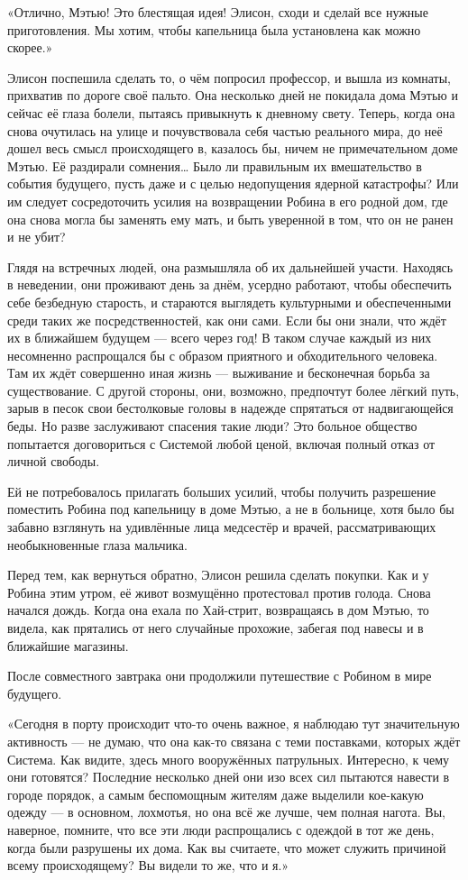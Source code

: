 \documentclass[a5paper, 9pt,
final, openany, twoside=true]{memoir}
\begin{document}
«Отлично, Мэтью! Это блестящая идея! Элисон, сходи и сделай все нужные приготовления. Мы хотим, чтобы капельница была установлена как можно скорее.»\bigskip

Элисон поспешила сделать то, о чём попросил профессор, и вышла из комнаты, прихватив по дороге своё пальто. Она несколько дней не покидала дома Мэтью и сейчас её глаза болели, пытаясь привыкнуть к дневному свету. Теперь, когда она снова очутилась на улице и почувствовала себя частью реального мира, до неё дошел весь смысл происходящего в, казалось бы, ничем не примечательном доме Мэтью. Её раздирали сомнения… Было ли правильным их вмешательство в события будущего, пусть даже и с целью недопущения ядерной катастрофы? Или им следует сосредоточить усилия на возвращении Робина в его родной дом, где она снова могла бы заменять ему мать, и быть уверенной в том, что он не ранен и не убит?

Глядя на встречных людей, она размышляла об их дальнейшей участи. Находясь в неведении, они проживают день за днём, усердно работают, чтобы обеспечить себе безбедную старость, и стараются выглядеть культурными и обеспеченными среди таких же посредственностей, как они сами. Если бы они знали, что ждёт их в ближайшем будущем — всего через год! В таком случае каждый из них несомненно распрощался бы с образом приятного и обходительного человека. Там их ждёт совершенно иная жизнь — выживание и бесконечная борьба за существование. С другой стороны, они, возможно, предпочтут более лёгкий путь, зарыв в песок свои бестолковые головы в надежде спрятаться от надвигающейся беды. Но разве заслуживают спасения такие люди? Это больное общество попытается договориться с Системой любой ценой, включая полный отказ от личной свободы.\bigskip

Ей не потребовалось прилагать больших усилий, чтобы получить разрешение поместить Робина под капельницу в доме Мэтью, а не в больнице, хотя было бы забавно взглянуть на удивлённые лица медсестёр и врачей, рассматривающих необыкновенные глаза мальчика.

Перед тем, как вернуться обратно, Элисон решила сделать покупки. Как и у Робина этим утром, её живот возмущённо протестовал против голода. Снова начался дождь. Когда она ехала по Хай-стрит, возвращаясь в дом Мэтью, то видела, как прятались от него случайные прохожие, забегая под навесы и в ближайшие магазины.

После совместного завтрака они продолжили путешествие с Робином в мире будущего.

«Сегодня в порту происходит что-то очень важное, я наблюдаю тут значительную активность — не думаю, что она как-то связана с теми поставками, которых ждёт Система. Как видите, здесь много вооружённых патрульных. Интересно, к чему они готовятся? Последние несколько дней они изо всех сил пытаются навести в городе порядок, а самым беспомощным жителям даже выделили кое-какую одежду — в основном, лохмотья, но она всё же лучше, чем полная нагота. Вы, наверное, помните, что все эти люди распрощались с одеждой в тот же день, когда были разрушены их дома. Как вы считаете, что может служить причиной всему происходящему? Вы видели то же, что и я.»\bigskip
\end{document}
